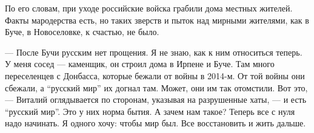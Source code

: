 По его словам, при уходе российские войска грабили дома местных жителей. Факты
мародерства есть, но таких зверств и пыток над мирными жителями, как в Буче, в
Новоселовке, к счастью, не было. 

— После Бучи русским нет прощения. Я не знаю, как к ним относиться теперь. У
меня сосед — каменщик, он строил дома в Ирпене и Буче. Там много переселенцев с
Донбасса, которые бежали от войны в 2014-м. От той войны они сбежали, а
\enquote{русский мир} их догнал там. Может, они им так отомстили. Вот это, — Виталий
оглядывается по сторонам, указывая на разрушенные хаты, — и есть \enquote{русский мир}.
Это у них норма бытия. А зачем нам такое? Теперь все с нуля надо начинать. Я
одного хочу: чтобы мир был. Все восстановить и жить дальше.
